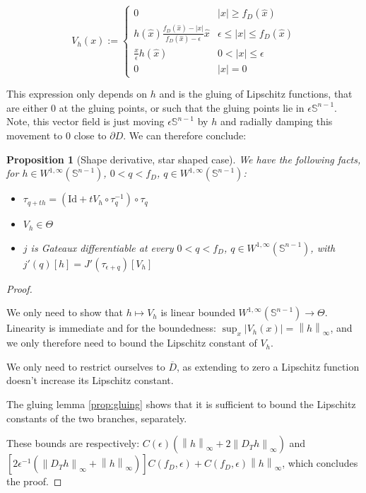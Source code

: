 \documentclass[english,a4paper,9pt,oneside]{scrbook}	%
\theoremstyle{break}
\newtheorem{prop}[equation]{Proposition}
\newenvironment{mproof}[1][\proofname]{%
  \begin{proof}[#1]$ $\par\nobreak\ignorespaces
}{%
  \end{proof}
}
\renewcommand*{\proofname}{Proof}
\theoremstyle{remark}
\newcommand{\mS}{\mathbb{S}^{n-1}}
\newcommand{\norm}[1]{\left\lVert#1\right\rVert}
\newcommand{\id}{\text{Id}}
\newcommand{\Te}{\Theta}
\newcommand{\xh}{\hat{x}}
\newcommand{\eps}{\epsilon}
\begin{document}
$$V_h(x) :=\left\{\begin{matrix}
 0 & |x|\geq f_D(\xh)\\ 
 h(\xh)\frac{f_D(\xh)-|x|}{f_D(\xh)-\eps}\xh & \eps \leq |x| \leq f_D(\xh) \\ 
 \frac{x}{\epsilon}h(\hat{x}) & 0<|x|\leq \eps\\ 
 0 & |x|=0
\end{matrix}\right.$$

This expression only depends on $h$ and is the gluing of Lipschitz functions, that are either $0$ at the gluing points, or such that the gluing points lie in $\eps\mS$. Note, this vector field is just moving $\eps \mS$ by $h$ and radially damping this movement to $0$ close to $\partial D$. We can therefore conclude:

\begin{prop}[Shape derivative, star shaped case]
\label{prop:star_shaped_gradient}
We have the following facts, for $h \in W^{1,\infty}(\mS)$, $0<q<f_D$, $q \in W^{1,\infty}(\mS)$:

\begin{itemize}
	\item $\tau_{q+th}=(\id + tV_h\circ \tau_q^{-1})\circ \tau_q$
	\item $V_h \in \Te$
	\item $j$ is Gateaux differentiable at every $0<q<f_D$, $q \in W^{1,\infty}(\mS)$, with $j'(q)[h] = J'(\tau_{\eps+q})[V_h]$
\end{itemize}

\end{prop}
\begin{mproof}

We only need to show that $h\mapsto V_h$ is linear bounded $W^{1,\infty}(\mS)\rightarrow \Te$. Linearity is immediate and for the boundedness: $\sup_x|V_h(x)| = \norm{h}_\infty$, and we only therefore need to bound the Lipschitz constant of $V_h$. 

We only need to restrict ourselves to $\overline{D}$, as extending to zero a Lipschitz function doesn't increase its Lipschitz constant.

The gluing lemma \cref{prop:gluing} shows that it is sufficient to bound the Lipschitz constants of the two branches, separately.

These bounds are respectively: $C(\eps)(\norm{h}_\infty + 2\norm{D_T h}_\infty)$ and $[2\eps^{-1}(\norm{D_T h}_\infty + \norm{h}_\infty)]C(f_D,\eps) + C(f_D,\eps)\norm{h}_\infty$, which concludes the proof.
\end{mproof}
\end{document}
